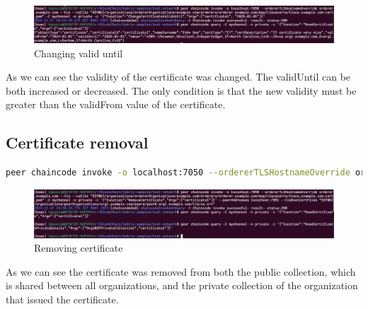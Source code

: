 \documentclass[12pt]{article}
\begin{document}
\begin{figure}[H]
    \centering
    \includegraphics[width=\textwidth]{imgs/changing_validity.PNG}
    \caption{Changing valid until}
    \label{fig:changingvaliduntil}
\end{figure}

As we can see the validity of the certificate was changed.
The validUntil can be both increased or decreased.
The only condition is that the new validity must be greater than the validFrom value of the certificate.

\subsection{Certificate removal}

\begin{lstlisting}[language=bash]
peer chaincode invoke -o localhost:7050 --ordererTLSHostnameOverride orderer.example.com --tls --cafile "${PWD}/organizations/ordererOrganizations/example.com/orderers/orderer.example.com/msp/tlscacerts/tlsca.example.com-cert.pem" -C mychannel -n private -c '{"function":"RemoveCertificate","Args":["certificate1"]}' --peerAddresses localhost:7051 --tlsRootCertFiles "${PWD}/organizations/peerOrganizations/org1.example.com/peers/peer0.org1.example.com/tls/ca.crt"
\end{lstlisting}

\begin{figure}[H]
    \includegraphics[width=\textwidth]{imgs/removing_certificate_and_checking_if_exists.PNG}
    \caption{Removing certificate}
    \label{fig:removingcertificate}
\end{figure}

As we can see the certificate was removed from both the public collection, which is shared between all organizations, and the private collection of the organization that issued the certificate.
\end{document}
